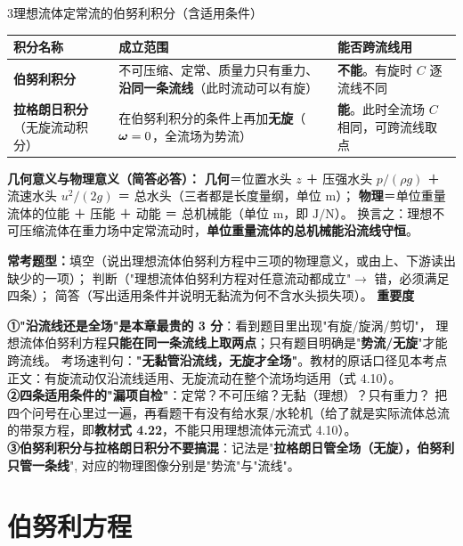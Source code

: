 \begin{kaodian}{3}{理想流体定常流的伯努利积分（含适用条件）}
\begin{center}
\begin{tabularx}{\textwidth}{@{}lXX@{}}
\toprule
积分名称 & 成立范围 & 能否跨流线用 \\
\midrule
\textbf{伯努利积分} & 不可压缩、定常、质量力只有重力、\textbf{沿同一条流线}（此时流动可以有旋） & \textbf{不能}。有旋时 $C$ 逐流线不同 \\
\textbf{拉格朗日积分}（无旋流动积分） & 在伯努利积分的条件上再加\textbf{无旋}（$\bm{\omega}=0$，全流场为势流） & \textbf{能}。此时全流场 $C$ 相同，可跨流线取点 \\
\bottomrule
\end{tabularx}
\end{center}

\textbf{几何意义与物理意义（简答必答）：}
\textbf{几何}＝位置水头 $z$ ＋ 压强水头 $p/(\rho g)$ ＋ 流速水头 $u^2/(2g)$ ＝ 总水头（三者都是长度量纲，单位 m）；
\textbf{物理}＝单位重量流体的位能 ＋ 压能 ＋ 动能 ＝ 总机械能（单位 m，即 $\mathrm{J/N}$）。
换言之：理想不可压缩流体在重力场中定常流动时，\textbf{单位重量流体的总机械能沿流线守恒}。

\textbf{常考题型：}填空（说出理想流体伯努利方程中三项的物理意义，或由上、下游读出缺少的一项）；
判断（"理想流体伯努利方程对任意流动都成立"$\to$ 错，必须满足四条）；
简答（写出适用条件并说明无黏流为何不含水头损失项）。
\textbf{重要度 }\quad{}\quad{}

\begin{banfa}
\textbf{①"沿流线还是全场"是本章最贵的 3 分}：看到题目里出现"有旋/旋涡/剪切"，
理想流体伯努利方程\textbf{只能在同一条流线上取两点}；只有题目明确是"\textbf{势流/无旋}"才能跨流线。
考场速判句：\textbf{"无黏管沿流线，无旋才全场"}。教材的原话口径见本考点正文：有旋流动仅沿流线适用、无旋流动在整个流场均适用（式 4.10）。\\
\textbf{②四条适用条件的"漏项自检"}：定常？不可压缩？无黏（理想）？只有重力？
把四个问号在心里过一遍，再看题干有没有给水泵/水轮机（给了就是实际流体总流的带泵方程，即\textbf{教材式 4.22}，不能只用理想流体元流式 4.10）。\\
\textbf{③伯努利积分与拉格朗日积分不要搞混}：记法是"\textbf{拉格朗日管全场（无旋），伯努利只管一条线}",
对应的物理图像分别是"势流"与"流线"。
\end{banfa}
\end{kaodian}

\section{伯努利方程}


